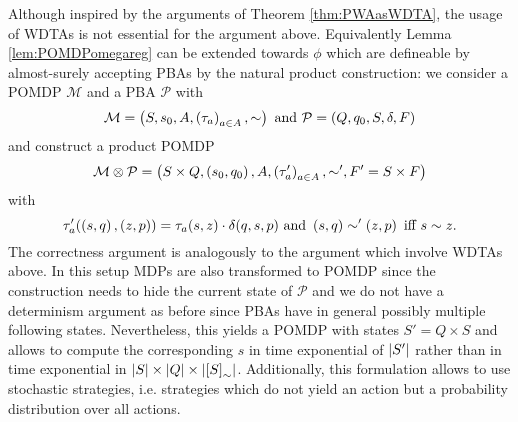 Although inspired by the arguments of Theorem \ref{thm:PWAasWDTA}, the usage 
of \acp{WDTA} is not essential for the argument above. Equivalently Lemma 
\ref{lem:POMDPomegareg} can be extended towards $\phi$ which
are defineable by almost-surely accepting \acp{PBA} by the natural product 
construction: we consider a \ac{POMDP} $\mathcal{M}$ and a \ac{PBA} 
$\mathcal{P}$ with
\begin{equation*}
  \mathcal{M} = \left(S, s_{0}, A, \left(\tau_{a}\right)_{a\in A}, \sim\right)
  \text{ and }
  \mathcal{P} = \left(Q, q_{0}, S, \delta, F\right)
\end{equation*}
and construct a product \ac{POMDP}
\begin{equation*}
  \mathcal{M}\otimes\mathcal{P} = \left(S\times Q, \left(s_{0}, q_{0}\right), A,
    \left(\tau'_{a}\right)_{a\in A}, \sim', F' = S\times F\right)
\end{equation*}
with
\begin{equation*}
  \tau'_{a}(\left(s, q\right), \left(z, p\right)) = \tau_{a}(s, z)\cdot\delta(q, s, p)
  \text{ and }
  \left(s, q\right)\sim'\left(z, p\right)\text{ iff }s\sim z.
\end{equation*}
The correctness argument is analogously to the argument which involve 
\acp{WDTA} above. In this setup \acp{MDP} are also transformed to \ac{POMDP} 
since the construction needs to hide the current state of $\mathcal{P}$ and we
do not have a determinism argument as before since \acp{PBA} have in general
possibly multiple following states. Nevertheless, this yields a \ac{POMDP} with
states $S' = Q\times S$ and allows to compute the corresponding $s$ in
time exponential of $\left\vert{S'}\right\vert$ rather than in time exponential in 
$\left\vert{S}\right\vert\times\left\vert{Q}\right\vert\times\left\vert{\left[S\right]_{\sim}}\right\vert$. Additionally, this
formulation allows to use stochastic strategies, i.e. strategies which do not
yield an action but a probability distribution over all actions. 
